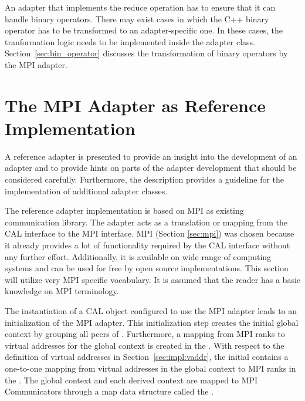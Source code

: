 \noindent An adapter that implements the reduce operation has to
ensure that it can handle binary operators.  There may exist cases in
which the C++ binary operator has to be transformed to an
adapter-specific one.  In these cases, the tranformation logic needs
to be implemented inside the adapter class.
Section~\ref{sec:bin_operator} discusses the transformation of binary
operators by the MPI adapter.

\section{The MPI Adapter as Reference Implementation}
\label{sec:cal_mpi_adapter}

A reference adapter is presented to provide an insight into the
development of an adapter and to provide hints on parts of the adapter
development that should be considered carefully. Furthermore, the
description provides a guideline for the implementation of additional
adapter classes.

The reference adapter implementation is based on MPI as existing
communication library. The adapter acts as a translation or mapping
from the CAL interface to the MPI interface.  MPI (Section
\ref{sec:mpi}) was chosen because it already provides a lot of
functionality required by the CAL interface without any further
effort. Additionally, it is available on wide range of computing
systems and can be used for free by open source implementations. This
section will utilize very MPI specific vocabulary. It is assumed
that the reader has a basic knowledge on MPI terminology.

The instantiation of a CAL object configured to use the MPI adapter
leads to an initialization of the MPI adapter. This initialization
step creates the initial global context by grouping all peers of
.  Furthermore, a mapping from MPI ranks to
virtual addresses for the global context is created in the
.  With respect to the definition of virtual addresses
in Section~\ref{sec:impl:vaddr}, the initial  contains a
one-to-one mapping from virtual addresses in the global context to MPI
ranks in the .  The global context and each
derived context are mapped to MPI Communicators through a map data
structure called the .

